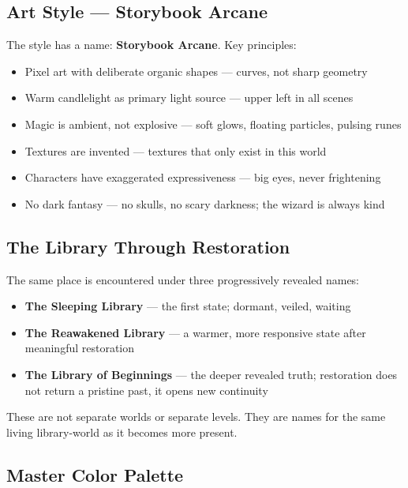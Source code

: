 \documentclass[11pt, a4paper]{article}
\begin{document}
\subsection{Art Style --- Storybook Arcane}

The style has a name: \textbf{Storybook Arcane}. Key principles:

\begin{itemize}[leftmargin=1.5em, itemsep=2pt]
  \item Pixel art with deliberate organic shapes --- curves, not sharp geometry
  \item Warm candlelight as primary light source --- upper left in all scenes
  \item Magic is ambient, not explosive --- soft glows, floating particles, pulsing runes
  \item Textures are invented --- textures that only exist in this world
  \item Characters have exaggerated expressiveness --- big eyes, never frightening
  \item No dark fantasy --- no skulls, no scary darkness; the wizard is always kind
\end{itemize}

\subsection{The Library Through Restoration}

The same place is encountered under three progressively revealed names:
\begin{itemize}[leftmargin=1.5em, itemsep=2pt]
  \item \textbf{The Sleeping Library} --- the first state; dormant, veiled, waiting
  \item \textbf{The Reawakened Library} --- a warmer, more responsive state after meaningful restoration
  \item \textbf{The Library of Beginnings} --- the deeper revealed truth; restoration does not return a pristine past, it opens new continuity
\end{itemize}

These are not separate worlds or separate levels. They are names for the same living library-world as it becomes more present.

\subsection{Master Color Palette}
\end{document}
